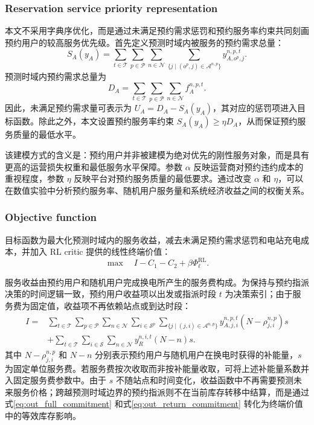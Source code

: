 \documentclass[12pt,hyperref,a4paper,UTF8]{ctexart}
\begin{document}
\subsubsection{Reservation service priority representation}

本文不采用字典序优化，而是通过未满足预约需求惩罚和预约服务率约束共同刻画预约用户的较高服务优先级。首先定义预测时域内被服务的预约需求总量：
\begin{equation}
S_A(y_A)=
\sum_{t\in\mathcal{T}}\sum_{p\in\mathcal{P}}\sum_{n\in\mathcal{N}}
\sum_{\{j\mid (o^p,j)\in\mathcal{A}^{n,p}\}}
y_{A,o^p,j}^{n,p,t}.
\label{eq:served_reservation_total}
\end{equation}
预测时域内预约需求总量为
\begin{equation}
D_A=
\sum_{t\in\mathcal{T}}\sum_{p\in\mathcal{P}}\sum_{n\in\mathcal{N}}
f_A^{n,p,t}.
\label{eq:reservation_total_demand}
\end{equation}
因此，未满足预约需求量可表示为 $U_A=D_A-S_A(y_A)$，其对应的惩罚项进入目标函数。除此之外，本文设置预约服务率约束 $S_A(y_A)\ge \eta D_A$，从而保证预约服务质量的最低水平。

该建模方式的含义是：预约用户并非被建模为绝对优先的刚性服务对象，而是具有更高的运营损失权重和最低服务水平保障。参数 $\alpha$ 反映运营商对预约违约成本的重视程度，参数 $\eta$ 反映平台对预约服务质量的最低要求。通过改变 $\alpha$ 和 $\eta$，可以在数值实验中分析预约服务率、随机用户服务量和系统经济收益之间的权衡关系。

\subsubsection{Objective function}

目标函数为最大化预测时域内的服务收益，减去未满足预约需求惩罚和电站充电成本，并加入 RL critic 提供的线性终端价值：
\begin{equation}
\max \quad I-C_1-C_2+\beta\Phi^{\mathrm{RL}}_{\ell}.
\label{eq:objective}
\end{equation}

服务收益由预约用户和随机用户完成换电所产生的服务费构成。为保持与预约指派决策的时间逻辑一致，预约用户收益项以出发或指派时段 $t$ 为决策索引；由于服务费为固定值，收益项不再依赖站点或到达时段：
\begin{equation}
\begin{aligned}
I=&
\sum_{t\in\mathcal{T}}\sum_{p\in\mathcal{P}}\sum_{n\in\mathcal{N}}
\sum_{i\in\mathcal{S}^{p}}
\sum_{\{j\mid (j,i)\in\mathcal{A}^{n,p}\}}
 y_{A,j,i}^{n,p,t}
\left(N-\rho_{j,i}^{n,p}\right)s
\\
&+
\sum_{t\in\mathcal{T}}\sum_{i\in\mathcal{S}}\sum_{n\in\mathcal{N}}
y_R^{n,i,t}(N-n)s.
\end{aligned}
\label{eq:income}
\end{equation}
其中 $N-\rho_{j,i}^{n,p}$ 和 $N-n$ 分别表示预约用户与随机用户在换电时获得的补能量，$s$ 为固定单位服务费。若服务费按次收取而非按补能量收取，可将上述补能量系数并入固定服务费参数中。由于 $s$ 不随站点和时间变化，收益函数中不再需要预测未来服务价格；跨越预测时域边界的预约指派则不在当前库存转移中结算，而是通过式\eqref{eq:out_full_commitment} 和式\eqref{eq:out_return_commitment} 转化为终端价值中的等效库存影响。
\end{document}
